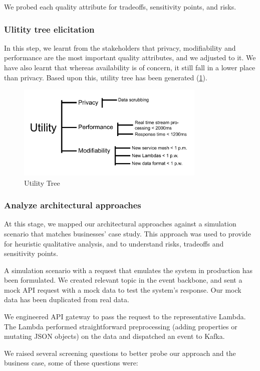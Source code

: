 \documentclass[conference]{IEEEtran}
\begin{document}
We probed each quality attribute for tradeoffs, sensitivity points, and risks.

\subsubsection{Ulitity tree elicitation}

In this step, we learnt from the stakeholders that privacy, modifiability and performance are the most important quality attributes, and we adjusted to it. We have also learnt that whereas availability is of concern, it still fall in a lower place than privacy. Based upon this, utility tree has been generated (\ref{UtilityFig}).


\begin{figure}
    \centering
    \includegraphics[width=9cm]{Utility Tree.pdf}
    \caption{Utility Tree} \label{UtilityFig}
\end{figure}


\subsubsection{Analyze architectural approaches}

At this stage, we mapped our architectural approaches against a simulation scenario that matches businesses' case study. This approach was used to provide for heuristic qualitative analysis, and to understand risks, tradeoffs and sensitivity points.

A simulation scenario with a request that emulates the system in production has been formulated. We created relevant topic in the event backbone, and sent a mock API request with a mock data to test the system's response. Our mock data has been duplicated from real data.

We engineered API gateway to pass the request to the representative Lambda. The Lambda performed straightforward preprocessing (adding properties or mutating JSON objects) on the data and dispatched an event to Kafka.

We raised several screening questions to better probe our approach and the business case, some of these questions were:
\end{document}
